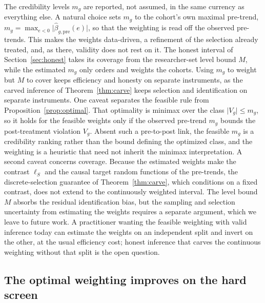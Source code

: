 \documentclass[12pt]{article}
\theoremstyle{remark}
\begin{document}
The credibility levels $m_g$ are reported, not assumed, in the same currency as everything else. A natural
choice sets $m_g$ to the cohort's own maximal pre-trend, $m_g=\max_{e<0}\lvert\hat\beta_{g,\mathrm{pre}}(e)
\rvert$, so that the weighting is read off the observed pre-trends. This makes the weights data-driven, a
refinement of the selection already treated, and, as there, validity does not rest on it. The honest
interval of Section~\ref{sec:honest} takes its coverage from the researcher-set level bound $M$, while the
estimated $m_g$ only orders and weights the cohorts. Using $m_g$ to weight but $M$ to cover keeps efficiency
and honesty on separate instruments, as the carved inference of Theorem~\ref{thm:carve} keeps
selection and identification on separate instruments. One caveat separates the feasible rule from
Proposition~\ref{prop:optimal}. That optimality is minimax over the class $\lvert V_g\rvert\le m_g$, so it
holds for the feasible weights only if the observed pre-trend $m_g$ bounds the post-treatment violation
$V_g$. Absent such a pre-to-post link, the feasible $m_g$ is a credibility ranking rather than the bound
defining the optimized class, and the weighting is a heuristic that need not inherit the minimax
interpretation. A second caveat concerns coverage. Because the estimated weights make the contrast $\ell_S$
and the causal target random functions of the pre-trends, the discrete-selection guarantee of
Theorem~\ref{thm:carve}, which conditions on a fixed contrast, does not extend to the continuously weighted
interval. The level bound $M$ absorbs the residual identification bias, but the sampling and selection
uncertainty from estimating the weights requires a separate argument, which we leave to future work.
A practitioner wanting the feasible weighting with valid inference today can estimate the weights on an
independent split and invert on the other, at the usual efficiency cost; honest inference that carves the
continuous weighting without that split is the open question.

\subsection{The optimal weighting improves on the hard screen}\label{sec:optsim}
\end{document}
